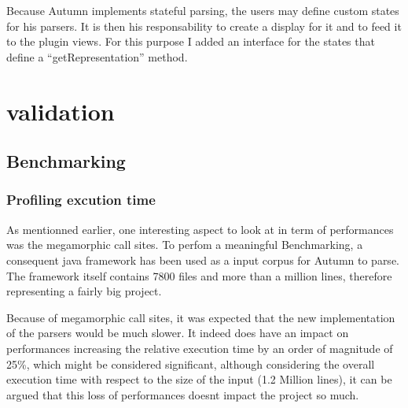 	Because Autumn implements stateful parsing, the users may define custom states for his parsers. It is then his responsability to create a display for it and to feed it to the plugin views. For this purpose I added an interface for the states that define a ``getRepresentation'' method.


%
\chapter{validation}
%

\section{Benchmarking}

\subsection{Profiling excution time}

As mentionned earlier, one interesting aspect to look at in term of performances was the megamorphic call sites. To perfom a meaningful Benchmarking, a consequent java framework \cite{java_corpus} has been used as a input corpus for Autumn to parse. The framework itself contains 7800 files and more than a million lines, therefore representing a fairly big project.

\bigskip

Because of megamorphic call sites, it was expected that the new implementation of the parsers would be much slower. It indeed does have an impact on performances increasing the relative execution time by an order of magnitude of 25\%, which might be considered significant, although considering the overall execution time with respect to the size of the input (1.2 Million lines), it can be argued that this loss of performances doesnt impact the project so much.

\bigskip

